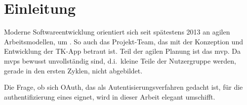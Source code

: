 \chapter{Einleitung}
Moderne Softwareentwicklung orientiert sich seit spätestens  2013
an agilen Arbeitsmodellen, um .
So auch das Projekt-Team, das mit der Konzeption und Entwicklung der TK-App
betraut ist. Teil der agilen Planung ist das \gls{mvp}. Da \glspl{mvp} bewusst
unvollständig sind, d.i.\ kleine Teile der Nutzergruppe werden, gerade in den
ersten Zyklen, nicht abgebildet.

Die Frage, ob sich OAuth, das als Autentisierungsverfahren gedacht ist, für die
authentifizierung eines eignet, wird in dieser Arbeit elegant umschifft.
